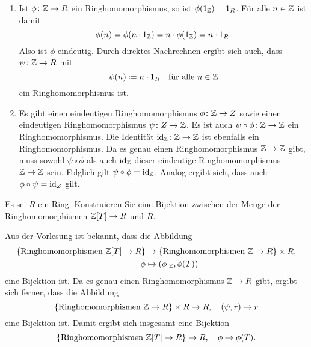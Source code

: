\begin{solution}
  \begin{enumerate}
    \item
      Ist $\phi \colon \mathbb{Z} \to R$ ein Ringhomomorphismus, so ist $\phi(1_{\mathbb{Z}}) = 1_R$.
      Für alle $n \in \mathbb{Z}$ ist damit
      \[
          \phi(n)
        = \phi(n \cdot 1_{\mathbb{Z}})
        = n \cdot \phi(1_{\mathbb{Z}})
        = n \cdot 1_R.
      \]
      Also ist $\phi$ eindeutig.
      Durch direktes Nachrechnen ergibt sich auch, dass $\psi \colon \mathbb{Z} \to R$ mit
      \[
        \psi(n) \coloneqq n \cdot 1_R
        \quad
        \text{für alle $n \in \mathbb{Z}$}
      \]
      ein Ringhomomorphismus ist.
    \item
      Es gibt einen eindeutigen Ringhomomorphismus $\phi \colon \mathbb{Z} \to Z$ sowie einen eindeutigen Ringhomomorphismus $\psi \colon Z \to \mathbb{Z}$.
      Es ist auch $\psi \circ \phi \colon \mathbb{Z} \to \mathbb{Z}$ ein Ringhomomorphismus.
      Die Identität $\operatorname{id}_{\mathbb{Z}} \colon \mathbb{Z} \to \mathbb{Z}$ ist ebenfalls ein Ringhomomorphismus.
      Da es genau einen Ringhomomorphismus $\mathbb{Z} \to \mathbb{Z}$ gibt, muss sowohl $\psi \circ \phi$ als auch $\operatorname{id}_{\mathbb{Z}}$  dieser eindeutige Ringhomomorphismus $\mathbb{Z} \to \mathbb{Z}$ sein.
      Folglich gilt $\psi \circ \phi = \operatorname{id}_{\mathbb{Z}}$.
      Analog ergibt sich, dass auch $\phi \circ \psi = \operatorname{id}_Z$ gilt.
  \end{enumerate}
\end{solution}


\begin{question}
  Es sei $R$ ein Ring.
  Konstruieren Sie eine Bijektion zwischen der Menge der Ringhomomorphismen $\mathbb{Z}[T] \to R$ und $R$.
\end{question}


\begin{solution}
  Aus der Vorlesung ist bekannt, dass die Abbildung
  \begin{align*}
              \{ \text{Ringhomomorphismen $\mathbb{Z}[T] \to R$} \}
    &\to      \{ \text{Ringhomomorphismen $\mathbb{Z} \to R$} \} \times R,
    \\
              \phi
    &\mapsto  (\phi|_{\mathbb{Z}}, \phi(T))
  \end{align*}
  eine Bijektion ist.
  Da es genau einen Ringhomomorphismus $\mathbb{Z} \to R$ gibt, ergibt sich ferner, dass die Abbildung
  \[
            \{ \text{Ringhomomorphismen $\mathbb{Z} \to R$} \} \times R
    \to     R,
    \quad
            (\psi, r)
    \mapsto r
  \]
  eine Bijektion ist.
  Damit ergibt sich insgesamt eine Bijektion
  \[
            \{ \text{Ringhomomorphismen $\mathbb{Z}[T] \to R$} \}
    \to     R,
    \quad
            \phi
    \mapsto \phi(T).
  \]
\end{solution}


